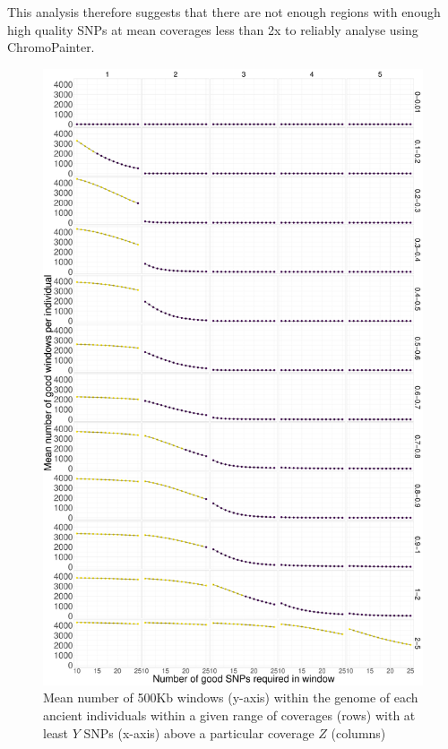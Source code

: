 {This analysis therefore suggests that there are not enough regions with enough high quality SNPs at mean coverages less than 2x to reliably analyse using ChromoPainter.

\begin{figure}[htp]
    \centering
    \includegraphics[width=1.0\textwidth]{../images/chapter1/avg_good_windows.pdf}
    \caption{Mean number of 500Kb windows (y-axis) within the genome of each ancient individuals within a given range of coverages (rows) with at least $Y$ SNPs (x-axis) above a particular coverage $Z$ (columns)}
    \label{fig:avg_good_windows}
\end{figure}


}
